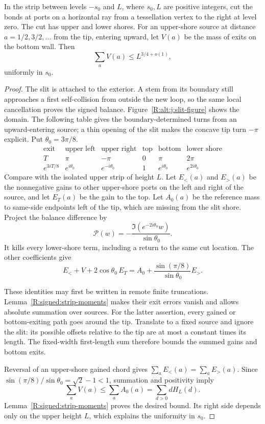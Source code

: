 \begin{lemma}\label{R:signed:slit}
In the strip between levels $-s_0$ and $L$, where $s_0,L$ are positive
integers, cut the bonds at ports on a horizontal ray from a tessellation
vertex to the right at level zero. The cut has upper and lower shores.
For an upper-shore source at distance $a=1/2,3/2,\ldots$ from the tip,
entering upward, let $V(a)$ be the mass of exits on the bottom wall. Then
\begin{equation}\label{R:alt:j:eq-br3}
 \sum_a V(a)\le L^{3/4+o(1)},
\end{equation}
uniformly in $s_0$.
\end{lemma}
\begin{proof}
The slit is attached to the exterior. A stem from its boundary still
approaches a first self-collision from outside the new loop, so the same
local cancellation proves the signed balance. Figure~\ref{R:alt:j:slit-figure} shows the domain. The following table gives
the boundary-determined turns from an upward-entering source; a thin
opening of the slit makes the concave tip turn $-\pi$ explicit. Put
$\theta_0=3\pi/8$.
\[
\begin{array}{c|ccccc}
\text{exit}&\text{upper left}&\text{upper right}&\text{top}
       &\text{bottom}&\text{lower shore}\\ \hline
T&\pi&-\pi&0&\pi&2\pi\\
e^{3iT/8}&e^{i\theta_0}&e^{-i\theta_0}&1
       &e^{i\theta_0}&e^{2i\theta_0}
\end{array}
\]
Compare with the isolated upper strip of height $L$. Let $E_<(a)$ and
$E_>(a)$ be the nonnegative gains to other upper-shore ports on the left
and right of the source, and let $E_T(a)$ be the gain to the top. Let
$A_0(a)$ be the reference mass to same-side endpoints left of the tip,
which are missing from the slit shore. Project the balance difference by
\[
 \mathcal P(w)=-\frac{\Im(e^{-2i\theta_0}w)}{\sin\theta_0}.
\]
It kills every lower-shore term, including a return to the same cut
location. The other coefficients give
\[
 E_<+V+2\cos\theta_0\,E_T
   =A_0+\frac{\sin(\pi/8)}{\sin\theta_0}E_>.
\]

These identities may first be written in remote finite truncations.
Lemma~\ref{R:signed:strip-moments} makes their exit errors vanish and
allows absolute summation over sources. For the latter assertion, every
gained or bottom-exiting path goes around the tip. Translate to a fixed
source and ignore the slit: its possible offsets relative to the tip
are at most a constant times its length. The fixed-width first-length
sum therefore bounds the summed gains and bottom exits.

Reversal of an upper-shore gained chord gives
$\sum_a E_<(a)=\sum_a E_>(a)$. Since
$\sin(\pi/8)/\sin\theta_0=\sqrt2-1<1$, summation and positivity imply
\[
 \sum_aV(a)\le\sum_aA_0(a)=\sum_{d>0}dH_L(d).
\]
Lemma~\ref{R:signed:strip-moments} proves the desired bound. Its right
side depends only on the upper height $L$, which explains the uniformity
in $s_0$.
\end{proof}

